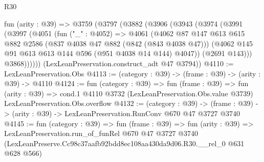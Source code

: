\begin{lexlean}{R30}
\begin{coremodule}
  fun (arity : @39) =>
  @3759
    (@3797
      (@3882
        (@3906
          (@3943
            (@3974
              (@3991
                (@3997
                  (@4051
                    (fun ("_" : @4052) =>
                    @4061
                      (@4062
                        @87
                        @147
                        @613
                        @615
                        @882
                        @2586
                        (@837 @4038 @47 @882 (@842 (@843 @4038 @47)))
                        (@4062 @145 @91 @613 @613 @144 @596 (@951 @4038 @14 @144) @4047))
                      (@2691 @143)))
                  @3868))))))
      (LexLeanPreservation.construct_adt @47 @3794))
@4110 := LexLeanPreservation.Obs
@4113 := (category : @39) -> (frame : @39) -> (arity : @39) -> @4110
@4124 := fun (category : @39) =>
  fun (frame : @39) =>
  fun (arity : @39) =>
  cond.{1} @4110 @3732 (LexLeanPreservation.Obs.value @3739) LexLeanPreservation.Obs.overflow
@4132 := (category : @39) ->
  (frame : @39) -> (arity : @39) -> LexLeanPreservation.RunConv @670 @47 @3727 @3740
@4145 := fun (category : @39) =>
  fun (frame : @39) =>
  fun (arity : @39) =>
  LexLeanPreservation.run_of_funRel
    @670
    @47
    @3727
    @3740
    (LexLeanPreserve.Cc98c37aafb92bdd8ec108aa430da9d06.R30.__rel_0 @631 @628 @566)
\end{coremodule}
\end{lexlean}
